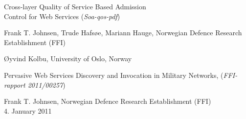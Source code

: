 
\begin{thebibliography}{1}

     Cross-layer Quality of Service Based Admission \\ Control for Web Services (\emph{Soa-qos-pdf}) 
    
        Frank T. Johnsen, Trude Hafsøe, Mariann Hauge, 
        Norwegian Defence Research Establishment (FFI) 

        Øyvind Kolbu, University of Oslo, Norway

     Pervasive Web Services Discovery and Invocation in Military Networks, (\emph{FFI-rapport 2011/00257})

        Frank T. Johnsen, Norwegian Defence Research Establishment (FFI) \\
        4. January 2011


\end{thebibliography}

